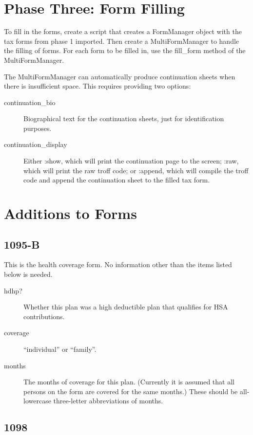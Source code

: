 \documentclass[12pt]{article}
\begin{document}
\section{Phase Three: Form Filling}

To fill in the forms, create a script that creates a FormManager object with the
tax forms from phase 1 imported. Then create a MultiFormManager to handle the
filling of forms. For each form to be filled in, use the fill\_form method of
the MultiFormManager.

The MultiFormManager can automatically produce continuation sheets when there is
insufficient space. This requires providing two options:
\begin{description}
\item[continuation\_bio] Biographical text for the continuation sheets, just for
identification purposes.
\item[continuation\_display] Either :show, which will print the continuation
page to the screen; :raw, which will print the raw troff code; or :append, which
will compile the troff code and append the continuation sheet to the filled tax
form.
\end{description}



\appendix


\section{Additions to Forms}

\subsection{1095-B}

This is the health coverage form. No information other than the items listed
below is needed.

\begin{description}
\item[hdhp?] Whether this plan was a high deductible plan that qualifies for HSA
contributions.
\item[coverage] ``individual'' or ``family''.
\item[months] The months of coverage for this plan. (Currently it is assumed
that all persons on the form are covered for the same months.) These should be
all-lowercase three-letter abbreviations of months.
\end{description}

\subsection{1098}
\end{document}
